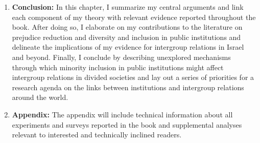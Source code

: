 \documentclass[12pt]{article}
\theoremstyle{plain}
\begin{document}
\begin{enumerate}

\item \textbf{Conclusion:} In this chapter, I summarize my central arguments and link each component of my theory with relevant evidence reported throughout the book. After doing so, I elaborate on my contributions to the literature on prejudice reduction and diversity and inclusion in public institutions and delineate the implications of my evidence for intergroup relations in Israel and beyond. Finally, I conclude by describing unexplored mechanisms through which minority inclusion in public institutions might affect intergroup relations in divided societies and lay out a series of priorities for a research agenda on the links between institutions and intergroup relations around the world.

\item \textbf{Appendix:} The appendix will include technical information about all experiments and surveys reported in the book and supplemental analyses relevant to interested and technically inclined readers.  

\end{enumerate}


\clearpage



\begin{singlespace}
 
%

\end{singlespace}
\end{document}
